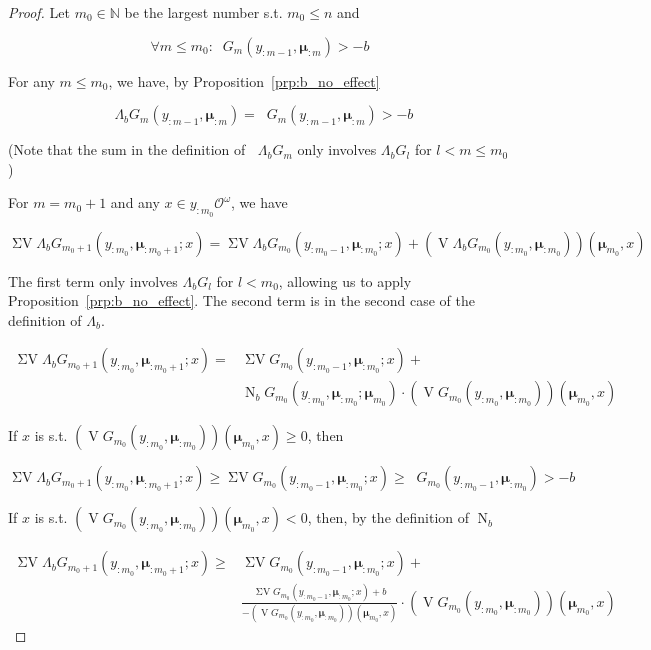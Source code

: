 \documentclass[11pt]{article}
\theoremstyle{definition}
\theoremstyle{plain}
\newcommand{\Nats}{\mathbb{N}}
\newcommand{\Ob}{\mathcal{O}}
\newcommand{\OO}{\Ob^\omega}
\DeclareMathOperator{\V}{V}
\DeclareMathOperator{\SV}{\Sigma V}
\DeclareMathOperator{\SVM}{\Sigma V_{\min}}
\DeclareMathOperator{\Nr}{N}
\newcommand{\Bd}{\Lambda}
\newcommand{\BM}{\bm{\mu}}
\begin{document}
\begin{proof}

Let ${m_0 \in \Nats}$ be the largest number s.t. ${m_0 \leq n}$ and 

$$\forall m \leq m_0: \SVM G_m\left(y_{:m-1},\BM_{:m}\right) > -b$$

For any ${m \leq m_0}$, we have, by Proposition~\ref{prp:b_no_effect}

$$\SVM \Bd_b G_m\left(y_{:m-1},\BM_{:m}\right)=\SVM G_m\left(y_{:m-1},\BM_{:m}\right) > -b$$

(Note that the sum in the definition of ${\SVM \Bd_b G_m}$ only involves ${\Bd_b G_l}$ for ${l < m \leq m_0}$)

For ${m=m_0+1}$ and any $x \in y_{:m_0}\OO$, we have

$$\SV \Bd_b G_{m_0+1}\left(y_{:m_0},\BM_{:m_0+1};x\right) = \SV \Bd_b G_{m_0}\left(y_{:m_0-1},\BM_{:m_0};x\right) + \left(\V \Bd_b G_{m_0}\left(y_{:m_0},\BM_{:m_0}\right)\right)\left(\BM_{m_0},x\right)$$

The first term only involves ${\Bd_b G_l}$ for ${l < m_0}$, allowing us to apply Proposition~\ref{prp:b_no_effect}. The second term is in the second case of the definition of $\Bd_b$.

\begin{align*}
\SV \Bd_b G_{m_0+1}\left(y_{:m_0},\BM_{:m_0+1};x\right) = &\SV G_{m_0}\left(y_{:m_0-1},\BM_{:m_0};x\right) +\\ &\Nr_b G_{m_0}\left(y_{:m_0},\BM_{:m_0};\BM_{m_0}\right) \cdot \left(\V G_{m_0}\left(y_{:m_0},\BM_{:m_0}\right)\right)\left(\BM_{m_0},x\right)
\end{align*}

If ${x}$ is s.t. ${\left(\V G_{m_0}\left(y_{:m_0},\BM_{:m_0}\right)\right)\left(\BM_{m_0},x\right) \geq 0}$, then

\[\SV \Bd_b G_{m_0+1}\left(y_{:m_0},\BM_{:m_0+1};x\right) \geq \SV G_{m_0}\left(y_{:m_0-1},\BM_{:m_0};x\right)\geq \SVM G_{m_0}\left(y_{:m_0-1},\BM_{:m_0}\right) > -b\]

If ${x}$ is s.t. ${\left(\V G_{m_0}\left(y_{:m_0},\BM_{:m_0}\right)\right)\left(\BM_{m_0},x\right) < 0}$, then, by the definition of $\Nr_b$

\begin{align*}
\SV \Bd_b G_{m_0+1}\left(y_{:m_0},\BM_{:m_0+1};x\right) \geq &\SV G_{m_0}\left(y_{:m_0-1},\BM_{:m_0};x\right)+ \\
&\frac{\SV G_{m_0}\left(y_{:m_0-1},\BM_{:m_0};x\right) + b}{-\left(\V G_{m_0}\left(y_{:m_0},\BM_{:m_0}\right)\right)\left(\BM_{m_0},x\right)} \cdot \left(\V G_{m_0}\left(y_{:m_0},\BM_{:m_0}\right)\right)\left(\BM_{m_0},x\right)
\end{align*}


\end{proof}
\end{document}

